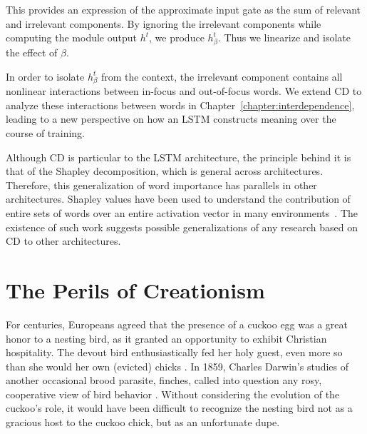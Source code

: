 This provides an expression of the approximate input gate as the sum of relevant and irrelevant components. By ignoring the irrelevant components while computing the module output $h^t$, we produce $h^t_{\beta}$. Thus we linearize and isolate the effect of $\beta$.

In order to isolate $h^t_{\beta}$ from the context, the irrelevant component contains all nonlinear interactions between in-focus and out-of-focus words. We extend CD to analyze these interactions between words in Chapter~\ref{chapter:interdependence}, leading to a new perspective on how an LSTM constructs meaning over the course of training. 

Although CD is particular to the LSTM architecture, the principle behind it is that of the Shapley decomposition, which is general across architectures. Therefore, this generalization of word importance has parallels in other architectures. Shapley values have been used to understand the contribution of entire sets of words over an entire activation vector in many environments~\cite{Lundberg2017AUA,chen_l-shapley_2018,ghorbani_neuron_2020,zhang_inducing_2020}. The existence of such work suggests possible generalizations of any research based on CD to other architectures.




\section{The Perils of Creationism}

For centuries, Europeans agreed that the presence of a cuckoo egg was a great honor to a nesting bird, as it granted an opportunity to exhibit Christian hospitality. The devout bird enthusiastically fed her holy guest, even more so than she would her own (evicted) chicks \citep{davies_cuckoo_2015}. In 1859, Charles Darwin's studies of another occasional brood parasite, finches, called into question any rosy, cooperative view of bird behavior \citep{darwin1964origin}. Without considering the evolution of the cuckoo's role, it would have been difficult to recognize the nesting bird not as a gracious host to the cuckoo chick, but as an unfortunate dupe.

